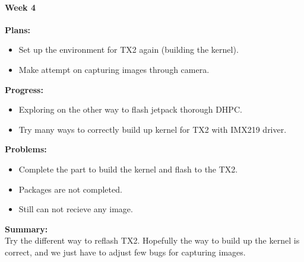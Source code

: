 \paragraph{Week 4}
\begin{adjustwidth}{2.5em}{0pt}
    \vspace{-0.5cm}\textbf{Plans:}
    \vspace{-0.5cm}
    \begin{itemize}
        \item Set up the environment for TX2 again (building the kernel).
        \item Make attempt on capturing images through camera.
    \end{itemize} 
    \vspace{-0.3cm}\textbf{Progress:}
    \vspace{-0.5cm}
    \begin{itemize}
        \item Exploring on the other way to flash jetpack thorough DHPC. 
        \item Try many ways to correctly build up kernel for TX2 with IMX219 driver.
    \end{itemize} 
    \vspace{-0.3cm}\textbf{Problems:}
    \vspace{-0.5cm}
    \begin{itemize}
        \item Complete the part to build the kernel and flash to the TX2.
        \item Packages are not completed.
        \item Still can not recieve any image.
    \end{itemize}  
    \vspace{-0.3cm}\noindent\textbf{Summary:}\\
    \noindent Try the different way to reflash TX2. Hopefully the way to build up the kernel is 
    correct, and we just have to adjust few bugs for capturing images. \\
\end{adjustwidth} 

